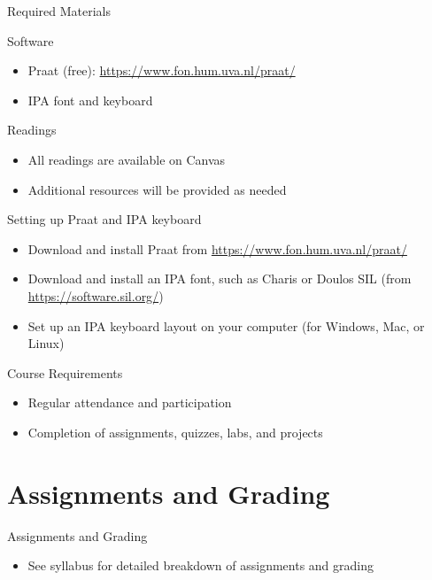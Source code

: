 \documentclass{beamer}
\begin{document}
\begin{frame}{Required Materials}
    \begin{block}{Software}
        \begin{itemize}
            \item Praat (free): \href{https://www.fon.hum.uva.nl/praat/}{https://www.fon.hum.uva.nl/praat/}
            \item IPA font and keyboard
        \end{itemize}
    \end{block}
    \begin{block}{Readings}
        \begin{itemize}
            \item All readings are available on Canvas
            \item Additional resources will be provided as needed
        \end{itemize}
    \end{block}
\end{frame}

\begin{frame}{Setting up Praat and IPA keyboard}
    \begin{itemize}
        \item Download and install Praat from \href{https://www.fon.hum.uva.nl/praat/}{https://www.fon.hum.uva.nl/praat/}
        \item Download and install an IPA font, such as Charis or Doulos SIL (from \href{https://software.sil.org/}{https://software.sil.org/})
        \item Set up an IPA keyboard layout on your computer (for Windows, Mac, or Linux)
    \end{itemize}
\end{frame}

\begin{frame}{Course Requirements}
    \begin{itemize}
        \item Regular attendance and participation
        \item Completion of assignments, quizzes, labs, and projects
    \end{itemize}
\end{frame}

\section{Assignments and Grading}
\begin{frame}{Assignments and Grading}
    \begin{itemize}
        \item See syllabus for detailed breakdown of assignments and grading
    \end{itemize}
\end{frame}     
\end{document}

